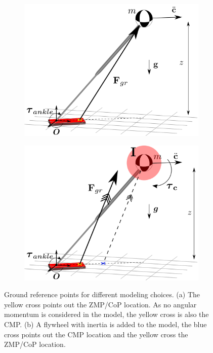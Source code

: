 \begin{figure}
\centering
\begin{subfigure}{0.49\textwidth}
\centering
\includegraphics[width=.9\linewidth]{STYLESTUFF/3DCoPviz.png}
\caption{}
\label{fig:3dlipfoot}
\end{subfigure}
\begin{subfigure}{0.49\textwidth}
\centering
\includegraphics[width=.9\linewidth]{STYLESTUFF/3DCMPCoPviz.png}	
\caption{}
\label{fig:3dlipfootinertia}
\end{subfigure}
\caption{Ground reference points for different modeling choices. (a) The yellow cross points out the \ac{ZMP}/\ac{CoP} location. As no angular momentum is considered in the model,  the yellow cross is also the \ac{CMP}. (b) A flywheel with inertia is added to the model, the blue cross points out the \ac{CMP} location and the yellow cross the \ac{ZMP}/\ac{CoP} location.}
\label{fig:zmpvscmp}
\end{figure}

